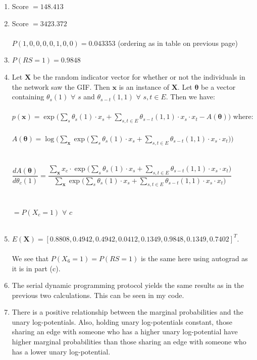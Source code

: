 \documentclass[10pt]{harvardml}
\theoremstyle{plain}
\begin{document}
\begin{enumerate}[label=(\alph*)]
\item Score $= 148.413$
\item Score $= 3423.372$\\\\
$P(1,0,0,0,0,1,0,0)=0.043353$ (ordering as in table on previous page)
\item $P(RS=1)=0.9848$
\item Let $\mathbf{X}$ be the random indicator vector for whether or not the individuals in the network saw the GIF. Then $\mathbf{x}$ is an instance of $\mathbf{X}$. Let $\bm{\theta}$ be a vector containing $\theta_s(1)$ $\forall$ $s$ and $\theta_{s-t}(1,1)$ $\forall$ $s,t\in E$. Then we have:\\\\
$p(\mathbf{x})=\exp\Bigg(\displaystyle\sum_{s}\theta_s(1)\cdot x_s+\displaystyle\sum_{s,t\in E}\theta_{s-t}(1,1)\cdot x_s\cdot x_t-A(\bm{\theta})\Bigg)$ where:\\\\
$A(\bm{\theta})=\log\Bigg(\displaystyle\sum_{\mathbf{x}}\exp\bigg(\displaystyle\sum_{s}\theta_s(1)\cdot x_s+\displaystyle\sum_{s,t\in E}\theta_{s-t}(1,1)\cdot x_s\cdot x_t\bigg)\Bigg)$\\\\\\
$\dfrac{dA(\bm{\theta})}{d\theta_c(1)}=\dfrac{\displaystyle\sum_{\mathbf{x}} x_c\cdot\exp\bigg(\displaystyle\sum_{s}\theta_s(1)\cdot x_s+\displaystyle\sum_{s,t\in E}\theta_{s-t}(1,1)\cdot x_s\cdot x_t\bigg)}{\displaystyle\sum_{\mathbf{x}}\exp\bigg(\displaystyle\sum_{s}\theta_s(1)\cdot x_s+\displaystyle\sum_{s,t\in E}\theta_{s-t}(1,1)\cdot x_s\cdot x_t\bigg)}$\\\\\\
$=P(X_c=1)$ $\forall$ $c$\\\\
\item $E(\mathbf{X})=[0.8808,0.4942,0.4942,0.0412,0.1349,0.9848,0.1349,0.7402]^T$.\\\\ 
We see that $P(X_6=1)=P(RS=1)$ is the same here using autograd as it is in part (c).
\item The serial dynamic programming protocol yields the same results as in the previous two calculations. This can be seen in my code.
\item There is a positive relationship between the marginal probabilities and the unary log-potentials. Also, holding unary log-potentials constant, those sharing an edge with someone who has a higher unary log-potential have higher marginal probabilities than those sharing an edge with someone who has a lower unary log-potential.\\\\

\end{enumerate}
\end{document}
